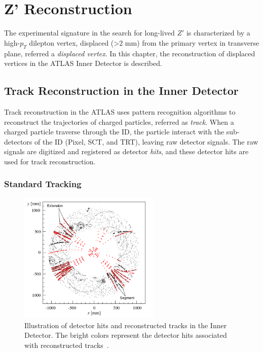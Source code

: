 \chapter{Z' Reconstruction}
\label{chap:reco}

The experimental signature in the search for long-lived $Z'$ is characterized by a high-$p_{T}$ dilepton vertex, displaced (>2 \si{\milli\meter}) from the primary vertex in transverse plane, referred a \textit{displaced vertex}. In this chapter, the reconstruction of displaced vertices in the ATLAS Inner Detector is described.

\section{Track Reconstruction in the Inner Detector}
\label{sec:reco:track}

Track reconstruction in the ATLAS uses pattern recognition algorithms to reconstruct the trajectories of charged particles, referred as \textit{track}. When a charged particle traverse through the ID, the particle interact with the sub-detectors of the ID (Pixel, SCT, and TRT), leaving raw detector signals. The raw signals are digitized and registered as detector \textit{hits}, and these detector hits are used for track reconstruction. 

\subsection{Standard Tracking}
\label{sec:reco:st}


\begin{figure}[!htb]
    \includegraphics[width=0.6\textwidth]{figs/tracking.png}
    \centering
    \caption{Illustration of detector hits and reconstructed tracks in the Inner Detector. The bright colors represent the detector hits associated with reconstructed tracks~\cite{1742-6596-119-3-032014}.}
    \label{fig:tracking}
\end{figure}

